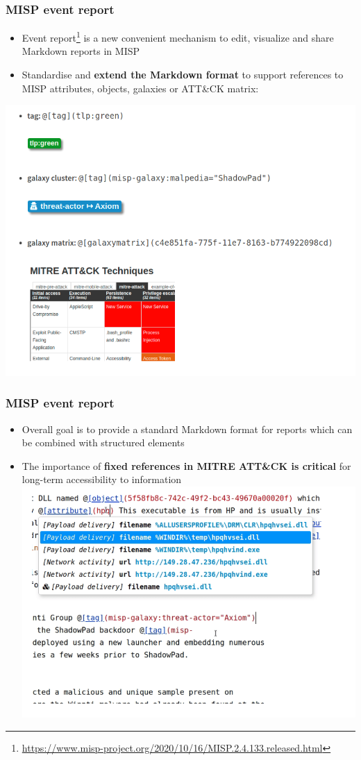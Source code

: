 \begin{frame}
  \frametitle{MISP event report}
  \begin{itemize}
        \item Event report\footnote{\url{https://www.misp-project.org/2020/10/16/MISP.2.4.133.released.html}} is a new convenient mechanism to edit, visualize and share Markdown reports in MISP
        \item Standardise and {\bf extend the Markdown format} to support references to MISP attributes, objects, galaxies or ATT\&CK matrix:
  \end{itemize}
        \includegraphics[scale=0.2]{report.png}
\end{frame}

\begin{frame}
  \frametitle{MISP event report}
  \begin{itemize}
        \item Overall goal is to provide a standard Markdown format for reports which can be combined with structured elements
        \item The importance of {\bf fixed references in MITRE ATT\&CK is critical} for long-term accessibility to information
        \includegraphics[scale=0.25]{view.png}
  \end{itemize}

\end{frame}


